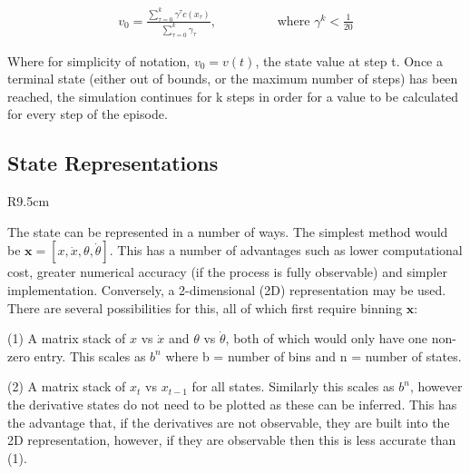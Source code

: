 \documentclass[../main.tex]{subfiles}
\begin{document}
\begin{align}
   \label{equ:value}
   v_0 = \frac{\sum_{\tau=0}^{k} \gamma^\tau c(x_\tau ) }{\sum_{\tau = 0}^k \gamma_\tau}, \hspace{2cm} \text{where } \gamma^k < \frac{1}{20}
\end{align}

Where for simplicity of notation, $v_0 = v(t)$, the state value at step t. Once a terminal state (either out of bounds, or the maximum number of steps) has been reached, the simulation continues for k steps in order for a value to be calculated for every step of the episode.

\subsection{State Representations}

\begin{wrapfigure}{R}{9.5cm}
   \label{fig:state2D}
\end{wrapfigure}

The state can be represented in a number of ways. The simplest method would be $\boldsymbol{x} = [x, \dot{x}, \theta, \dot{\theta}]$. This has a number of advantages such as lower computational cost, greater numerical accuracy (if the process is fully observable) and simpler implementation. Conversely, a 2-dimensional (2D) representation may be used. There are several possibilities for this, all of which first require binning $\boldsymbol{x}$:

(1) A matrix stack of $x$ vs $\dot{x}$ and $\theta$ vs $\dot{\theta}$, both of which would only have one non-zero entry. This scales as $b^n$ where b = number of bins and n = number of states.

(2) A matrix stack of $x_t$ vs $x_{t-1}$ for all states. Similarly this scales as $b^n$, however the derivative states do not need to be plotted as these can be inferred. This has the advantage that, if the derivatives are not observable, they are built into the 2D representation, however, if they are observable then this is less accurate than (1).
\end{document}
